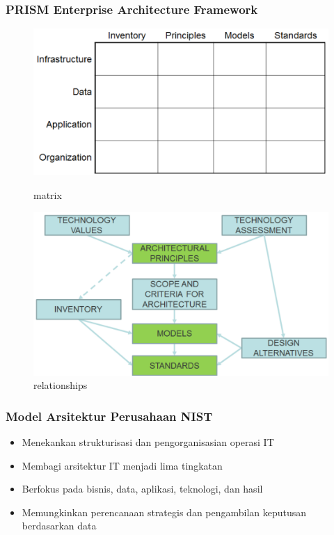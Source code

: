 \documentclass[aspectratio=169, table]{beamer}
\begin{document}
	{
		\begin{frame}
			\frametitle{PRISM Enterprise Architecture Framework}
			\begin{center}
				
				\begin{figure}[ht]
					\begin{minipage}[b]{0.49\linewidth}
						\centering
						\includegraphics[width=\textwidth]{../figures/prism_matrix}
						\caption{matrix}
					\end{minipage}
					\hfill
					\begin{minipage}[b]{0.49\linewidth}
						\centering
						\includegraphics[width=\textwidth]{../figures/prism_relationships}
						\caption{relationships}
					\end{minipage}
				\end{figure}
				
			\end{center}
		\end{frame}
	}
	
	\begin{frame}
		\frametitle{Model Arsitektur Perusahaan NIST}
		\begin{itemize}
			\item Menekankan strukturisasi dan pengorganisasian operasi IT
			\item Membagi arsitektur IT menjadi lima tingkatan
			\item Berfokus pada bisnis, data, aplikasi, teknologi, dan hasil
			\item Memungkinkan perencanaan strategis dan pengambilan keputusan berdasarkan data
		\end{itemize}
	\end{frame}
	
\end{document}
